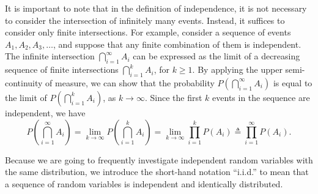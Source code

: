 It is important to note that in the definition of independence, it is not necessary to consider the intersection of infinitely many events. Instead, it suffices to consider only finite intersections. For example, consider a sequence of events $A_1,A_2,A_3,\ldots$, and suppose that any finite combination of them is independent. The infinite intersection $\bigcap_{i=1}^{\infty} A_i$ can be expressed as the limit of a decreasing sequence of finite intersections $\bigcap_{i=1}^{k} A_i$, for $k \ge 1$. By applying the upper semi-continuity of measure, we can show that the probability $P\left(\bigcap_{i=1}^{\infty} A_i\right)$ is equal to the limit of $P\left(\bigcap_{i=1}^{k} A_i\right)$, as $k \to \infty$. Since the first $k$ events in the sequence are independent, we have
\[
P\left(\bigcap_{i=1}^{\infty} A_i\right)=\lim_{k \to \infty} P\left(\bigcap_{i=1}^{k} A_i\right)=\lim_{k \to \infty} \prod_{i=1}^{k} P(A_i) \triangleq \prod_{i=1}^{\infty} P(A_i).
\]

Because we are going to frequently investigate independent random variables with the same distribution, we introduce the short-hand notation ``i.i.d.'' to mean that a sequence of random variables is independent and identically distributed.
